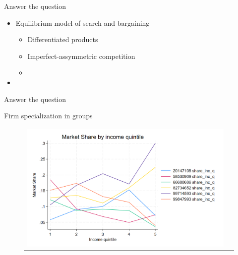 \documentclass[notes, 10pt,aspectratio=169]{beamer}
\begin{document}





\begin{frame}{Answer the question}
    \begin{itemize}
        \item Equilibrium model of search and bargaining 
        \begin{itemize}
            \ite
            \item Differentiated products   \hyperlink{slide:fig1}{}
            \item Imperfect-assymmetric competition\hyperlink{slide:fig3}{}
            \item 
        \end{itemize}
        \item 
    \end{itemize}
\end{frame}


\begin{frame}{Answer the question}\label{slide:fig1}    

Firm specialization in groups
\begin{figure}[H]
\centering{}%
\begin{tabular}{cc}
\includegraphics[scale=0.27]{../figures/IE3_supply_income_quintile.png}
\end{tabular}
\end{figure}
\end{frame}
\end{document}
